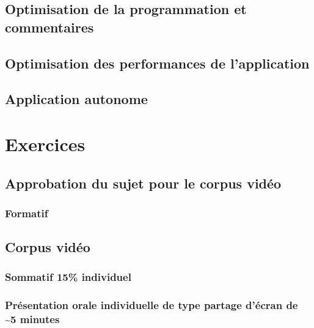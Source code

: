 \documentclass[
]{book}
\begin{document}
\hypertarget{optimisation-de-la-programmation-et-commentaires}{%
\section{Optimisation de la programmation et commentaires}\label{optimisation-de-la-programmation-et-commentaires}}

\hypertarget{optimisation-des-performances-de-lapplication}{%
\section{Optimisation des performances de l'application}\label{optimisation-des-performances-de-lapplication}}

\hypertarget{application-autonome}{%
\section{Application autonome}\label{application-autonome}}

\hypertarget{exercices}{%
\chapter{Exercices}\label{exercices}}

\hypertarget{formatif_1}{%
\section{Approbation du sujet pour le corpus vidéo}\label{formatif_1}}

\hypertarget{formatif}{%
\subsection{Formatif}\label{formatif}}

\hypertarget{sommatif_1}{%
\section{Corpus vidéo}\label{sommatif_1}}

\hypertarget{sommatif-15-individuel}{%
\subsection{Sommatif 15\% individuel}\label{sommatif-15-individuel}}

\hypertarget{pruxe9sentation-orale-individuelle-de-type-partage-duxe9cran-de-5-minutes}{%
\subsection{Présentation orale individuelle de type partage d'écran de \textasciitilde5 minutes}\label{pruxe9sentation-orale-individuelle-de-type-partage-duxe9cran-de-5-minutes}}
\end{document}
